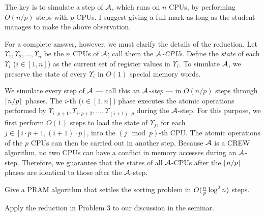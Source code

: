 \begin{sol}
     The key is to simulate a step of $\mathcal{A}$, which runs on $n$ CPUs, by performing $O(n/p)$ steps with $p$ CPUs. I suggest giving a full mark as long as the student manages to make the above observation.

    \vgap

    For a complete answer, however, we must clarify the details of the reduction. Let $\Upsilon_1, \Upsilon_2, ..., \Upsilon_n$ be the $n$ CPUs of $\mathcal{A}$; call them the {\em $\mathcal{A}$-CPUs}. Define the {\em state} of each $\Upsilon_i$ ($i \in [1, n]$) as the current set of register values in $\Upsilon_i$. To simulate $\mathcal{A}$, we preserve the state of every $\Upsilon_i$ in $O(1)$ special memory words.

    \vgap

    We simulate every step of $\mathcal{A}$ --- call this an {\em $\mathcal{A}$-step} --- in $O(n/p)$ steps through $\lceil n / p \rceil$ phases. The $i$-th ($i \in [1, n]$) phase executes the atomic operations performed by $\Upsilon_{i \cdot p+1}, \Upsilon_{i \cdot p+2}, ..., \Upsilon_{(i+1) \cdot p}$ during the $\mathcal{A}$-step. For this purpose, we first perform $O(1)$ steps to load the state of $\Upsilon_j$, for each $j \in [i \cdot p+1, (i+1) \cdot p]$, into the $(j \mod p)$-th CPU. The atomic operations of the $p$ CPUs can then be carried out in another step. Because $\mathcal{A}$ is a CREW algorithm, no two CPUs can have a conflict in memory accesses during an $\mathcal{A}$-step. Therefore, we guarantee that the states of all $\mathcal{A}$-CPUs after   the $\lceil n / p \rceil$ phases are identical to those after the $\mathcal{A}$-step.
\end{sol}

 Give a PRAM algorithm that settles the sorting problem in $O(\frac{n}{p} \log^2 n)$ steps.

\begin{sol}
     Apply the reduction in Problem 3 to our discussion in the seminar.
\end{sol}



